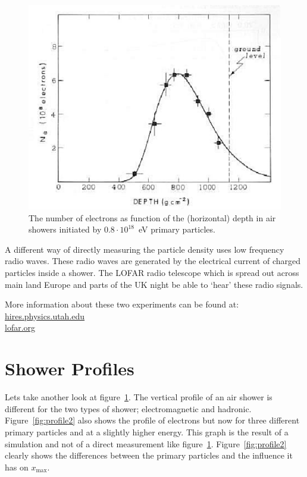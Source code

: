 \documentclass[12pt,a4paper]{article}
\numberwithin{equation}{section}
\numberwithin{figure}{section}
\numberwithin{table}{section}
\begin{document}
\begin{figure}\begin{center}
\includegraphics[scale=0.5]{profile.eps}%
\caption{The number of electrons as function of the (horizontal) depth in air showers initiated by $0.8 \cdot 10^{18}$~eV primary particles.}\label{fig:profile}
\end{center}\end{figure}

A different way of directly measuring the particle density uses low frequency radio waves. These radio waves are generated by the electrical current of charged particles inside a shower. The LOFAR radio telescope which is spread out across main land Europe and parts of the UK night be able to `hear' these radio signals.

More information about these two experiments can be found at:\\
\url{hires.physics.utah.edu} \\
\url{lofar.org}

\section{Shower Profiles}
Lets take another look at figure~\ref{fig:profile}. The vertical profile of an air shower is different for the two types of shower; electromagnetic and hadronic. Figure~\ref{fig:profile2} also shows the profile of electrons but now for three different primary particles and at a slightly higher energy. This graph is the result of a simulation and not of a direct measurement like figure~\ref{fig:profile}. Figure~\ref{fig:profile2} clearly shows the differences between the primary particles and the influence it has on $x_{\mbox{max}}$. 
\end{document}
